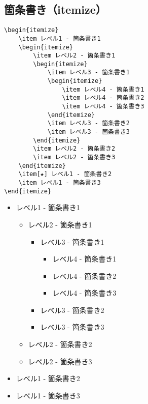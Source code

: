 \subsection{箇条書き（itemize）}

\begin{verbatim}
\begin{itemize}
    \item レベル1 - 箇条書き1
    \begin{itemize}
        \item レベル2 - 箇条書き1
        \begin{itemize}
            \item レベル3 - 箇条書き1
            \begin{itemize}
                \item レベル4 - 箇条書き1
                \item レベル4 - 箇条書き2
                \item レベル4 - 箇条書き3
            \end{itemize}
            \item レベル3 - 箇条書き2
            \item レベル3 - 箇条書き3
        \end{itemize}
        \item レベル2 - 箇条書き2
        \item レベル2 - 箇条書き3
    \end{itemize}
    \item[★] レベル1 - 箇条書き2
    \item レベル1 - 箇条書き3
\end{itemize}
\end{verbatim}

\begin{itemize}
    \item レベル1 - 箇条書き1
    \begin{itemize}
        \item レベル2 - 箇条書き1
        \begin{itemize}
            \item レベル3 - 箇条書き1
            \begin{itemize}
                \item レベル4 - 箇条書き1
                \item レベル4 - 箇条書き2
                \item レベル4 - 箇条書き3
            \end{itemize}
            \item レベル3 - 箇条書き2
            \item レベル3 - 箇条書き3
        \end{itemize}
        \item レベル2 - 箇条書き2
        \item レベル2 - 箇条書き3
    \end{itemize}
    \item レベル1 - 箇条書き2
    \item レベル1 - 箇条書き3
\end{itemize}
